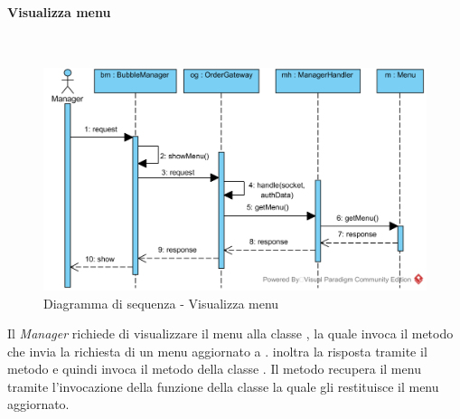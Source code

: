 \paragraph{Visualizza menu}\mbox{} \\
\nopagebreak
\begin{figure}[H]
	\centering
	\includegraphics[width=15cm]{./diagrammi/sequenza/visualizza_menu.png}
	\caption{Diagramma di sequenza - Visualizza menu}
\end{figure}
Il \textit{Manager} richiede di visualizzare il menu alla classe , la quale invoca il metodo  che invia la richiesta di un menu aggiornato a .  inoltra la risposta tramite il metodo  e quindi invoca il metodo  della classe . Il metodo recupera il menu tramite l'invocazione della funzione  della classe  la quale gli restituisce il menu aggiornato.

